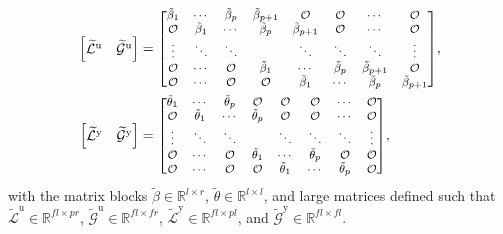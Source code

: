 \begin{align*}
    \begin{bmatrix}
        \widetilde{\mathcal{L}}^\mathrm{u} & \widetilde{\mathcal{G}}^\mathrm{u} 
    \end{bmatrix}&= {\scriptsize
    \begin{bmatrix}
        \tilde{\beta}_1     & \cdots      & \tilde{\beta}_{p}   & \tilde{\beta}_{p+1} & \mathcal{O} & \mathcal{O} & \cdots      & \mathcal{O}\\
        \mathcal{O} & \tilde{\beta}_1     & \cdots      & \tilde{\beta}_{p}   & \tilde{\beta}_{p+1} & \mathcal{O} & \cdots      & \mathcal{O}\\
        \vdots      & \ddots      & \ddots      &             & \ddots      & \ddots      & \ddots      & \vdots     \\
        \mathcal{O} & \cdots      & \mathcal{O} & \tilde{\beta}_1     & \cdots      & \tilde{\beta}_{p}   & \tilde{\beta}_{p+1} & \mathcal{O}\\
        \mathcal{O} & \cdots      & \mathcal{O} & \mathcal{O} & \tilde{\beta}_1     & \cdots      & \tilde{\beta}_{p}   & \tilde{\beta}_{p+1}\\
    \end{bmatrix}},\\
    \begin{bmatrix}
        \widetilde{\mathcal{L}}^\mathrm{y} & \widetilde{\mathcal{G}}^\mathrm{y} 
    \end{bmatrix}&= {\scriptsize
    \begin{bmatrix}
        \tilde{\theta}_1    & \cdots      & \tilde{\theta}_{p}  & \mathcal{O}  & \mathcal{O}  & \mathcal{O} & \cdots       & \mathcal{O}\\
        \mathcal{O} & \tilde{\theta}_1    & \cdots      & \tilde{\theta}_{p}   & \mathcal{O}  & \mathcal{O} & \cdots       & \mathcal{O}\\
        \vdots      & \ddots      & \ddots      &              & \ddots       & \ddots      & \ddots       & \vdots     \\
        \mathcal{O} & \cdots      & \mathcal{O} & \tilde{\theta}_1     & \cdots       & \tilde{\theta}_{p}  & \mathcal{O}  & \mathcal{O}\\
        \mathcal{O} & \cdots      & \mathcal{O} & \mathcal{O}  & \tilde{\theta}_1     & \cdots      & \tilde{\theta}_{p}   & \mathcal{O}\\
    \end{bmatrix}},
\end{align*}
with the matrix blocks $\tilde{\beta}\in\mathbb{R}^{l\times r}$, $\tilde{\theta}\in\mathbb{R}^{l\times l}$, and large matrices defined such that $\widetilde{\mathcal{L}}^\mathrm{u}\in\mathbb{R}^{fl\times pr}$, $\widetilde{\mathcal{G}}^\mathrm{u}\in\mathbb{R}^{fl\times fr}$, $\widetilde{\mathcal{L}}^\mathrm{y}\in\mathbb{R}^{fl\times pl}$, and $\widetilde{\mathcal{G}}^\mathrm{y}\in\mathbb{R}^{fl\times fl}$.

